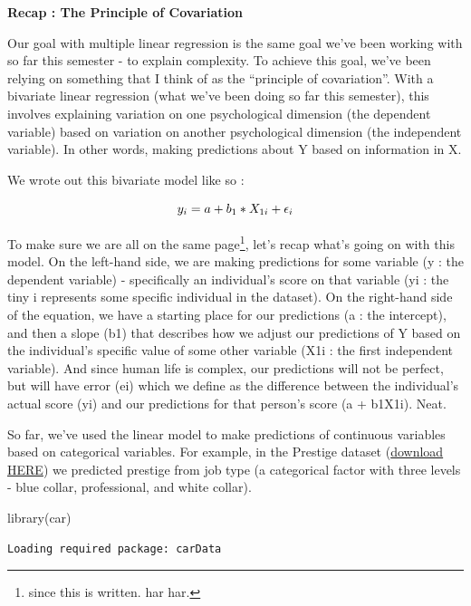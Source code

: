 \documentclass[
  letterpaper,
  DIV=11,
  numbers=noendperiod,
  oneside]{scrreprt}
\newenvironment{Shaded}{\begin{snugshade}}{\end{snugshade}}
\newcommand{\FunctionTok}[1]{\textcolor[rgb]{0.28,0.35,0.67}{#1}}
\newcommand{\NormalTok}[1]{\textcolor[rgb]{0.00,0.23,0.31}{#1}}
\begin{document}
\textbf{Recap : The Principle of Covariation}

Our goal with multiple linear regression is the same goal we've been
working with so far this semester - to explain complexity. To achieve
this goal, we've been relying on something that I think of as the
``principle of covariation''. With a bivariate linear regression (what
we've been doing so far this semester), this involves explaining
variation on one psychological dimension (the dependent variable) based
on variation on another psychological dimension (the independent
variable). In other words, making predictions about Y based on
information in X.

We wrote out this bivariate model like so :

\[\huge y_i = a + b_1*X_{1i} + {\epsilon}_i\]

To make sure we are all on the same page\footnote{since this is written.
  har har.}, let's recap what's going on with this model. On the
left-hand side, we are making predictions for some variable (y : the
dependent variable) - specifically an individual's score on that
variable (yi : the tiny i represents some specific individual in the
dataset). On the right-hand side of the equation, we have a starting
place for our predictions (a : the intercept), and then a slope (b1)
that describes how we adjust our predictions of Y based on the
individual's specific value of some other variable (X1i : the first
independent variable). And since human life is complex, our predictions
will not be perfect, but will have error (ei) which we define as the
difference between the individual's actual score (yi) and our
predictions for that person's score (a + b1X1i). Neat.

So far, we've used the linear model to make predictions of continuous
variables based on categorical variables. For example, in the Prestige
dataset
(\href{https://www.dropbox.com/s/lca1e7vdkt27wz0/prestige_data.csv?dl=1}{download
HERE}) we predicted prestige from job type (a categorical factor with
three levels - blue collar, professional, and white collar).

\begin{Shaded}
\begin{Highlighting}[]
\FunctionTok{library}\NormalTok{(car)}
\end{Highlighting}
\end{Shaded}

\begin{verbatim}
Loading required package: carData
\end{verbatim}
\end{document}
